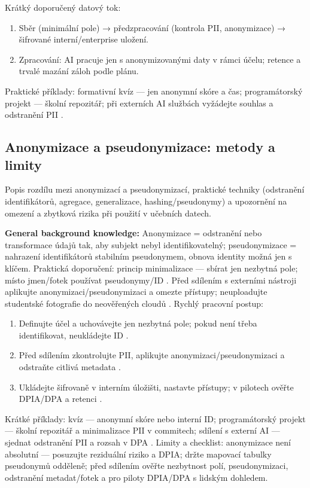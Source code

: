 \documentclass{report}%
\begin{document}
Krátký doporučený datový tok:
\begin{enumerate}
  \item Sběr (minimální pole) → předzpracování (kontrola PII, anonymizace) → šifrované interní/enterprise uložení.
  \item Zpracování: AI pracuje jen s anonymizovanými daty v rámci účelu; retence a trvalé mazání záloh podle plánu.
\end{enumerate}

Praktické příklady: formativní kvíz — jen anonymní skóre a čas; programátorský projekt — školní repozitář; při externích AI službách vyžádejte souhlas a odstranění PII \cite{kb_ai_101_tipu_pdf_04e4a115_page_53_2}.%

%
\subsection{Anonymizace a pseudonymizace: metody a limity}%
Popis rozdílu mezi anonymizací a pseudonymizací, praktické techniky (odstranění identifikátorů, agregace, generalizace, hashing/pseudonymy) a upozornění na omezení a zbytková rizika při použití v učebních datech.%


%
\textbf{General background knowledge:} Anonymizace = odstranění nebo transformace údajů tak, aby subjekt nebyl identifikovatelný; pseudonymizace = nahrazení identifikátorů stabilním pseudonymem, obnova identity možná jen s klíčem.
Praktická doporučení: princip minimalizace — sbírat jen nezbytná pole; místo jmen/fotek používat pseudonymy/ID \cite{kb_ai_101_tipu_pdf_04e4a115_page_8_1}.
Před sdílením s externími nástroji aplikujte anonymizaci/pseudonymizaci a omezte přístupy; neuploadujte studentské fotografie do neověřených cloudů \cite{kb_ai_101_tipu_pdf_04e4a115_page_8_1, kb_ai_101_tipu_pdf_04e4a115_page_53_2}.
Rychlý pracovní postup:
\begin{enumerate}
\item Definujte účel a uchovávejte jen nezbytná pole; pokud není třeba identifikovat, neukládejte ID \cite{kb_ai_101_tipu_pdf_04e4a115_page_8_1}.
\item Před sdílením zkontrolujte PII, aplikujte anonymizaci/pseudonymizaci a odstraňte citlivá metadata \cite{kb_ai_101_tipu_pdf_04e4a115_page_8_1}.
\item Ukládejte šifrovaně v interním úložišti, nastavte přístupy; v pilotech ověřte DPIA/DPA a retenci \cite{kb_ai_101_tipu_pdf_04e4a115_page_8_1, kb_malinka_chatgpt_ve_vyuce_dva_roky_pote_2024_pdf_90bc3aaf_page_12_1}.
\end{enumerate}
Krátké příklady: kvíz — anonymní skóre nebo interní ID; programátorský projekt — školní repozitář a minimalizace PII v commitech; sdílení s externí AI — sjednat odstranění PII a rozsah v DPA \cite{kb_ai_101_tipu_pdf_04e4a115_page_8_1, kb_ai_101_tipu_pdf_04e4a115_page_53_2, kb_malinka_chatgpt_ve_vyuce_dva_roky_pote_2024_pdf_90bc3aaf_page_12_1}.
Limity a checklist: anonymizace není absolutní — posuzujte reziduální riziko a DPIA; držte mapovací tabulky pseudonymů odděleně; před sdílením ověřte nezbytnost polí, pseudonymizaci, odstranění metadat/fotek a pro piloty DPIA/DPA s lidským dohledem.%
\end{document}
